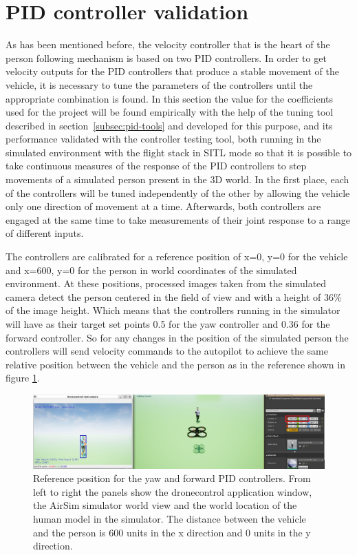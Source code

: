 
\clearpage

\section{PID controller validation}
\label{sec:test-1-pid}


As has been mentioned before, the velocity controller that is the heart of the person following mechanism is based on two PID controllers.
In order to get velocity outputs for the PID controllers that produce a stable movement of the vehicle, it is necessary to tune the parameters of the controllers until the appropriate combination is found.
In this section the value for the coefficients used for the project will be found empirically with the help of the tuning tool described in section~\ref{subsec:pid-tools} and developed for this purpose, and its performance validated with the controller testing tool, both running in the simulated environment with the flight stack in SITL mode so that it is possible to take continuous measures of the response of the PID controllers to step movements of a simulated person present in the 3D world.
In the first place, each of the controllers will be tuned independently of the other by allowing the vehicle only one direction of movement at a time.
Afterwards, both controllers are engaged at the same time to take measurements of their joint response to a range of different inputs.

The controllers are calibrated for a reference position of x=0, y=0 for the vehicle and x=600, y=0 for the person in world coordinates of the simulated environment.
At these positions, processed images taken from the simulated camera detect the person centered in the field of view and with a height of 36\% of the image height.
Which means that the controllers running in the simulator will have as their target set points 0.5 for the yaw controller and 0.36 for the forward controller. So for any changes in the position of the simulated person the controllers will send velocity commands to the autopilot to achieve the same relative position between the vehicle and the person as in the reference shown in figure \ref{fig:tune-start-pos}.

\begin{figure}
  \centering
  \includegraphics[width=\textwidth, keepaspectratio]{img/pid/tune-ref-pos.jpg}
  \caption{Reference position for the yaw and forward PID controllers. From left to right the panels show the dronecontrol application window, the AirSim simulator world view and the world location of the human model in the simulator. The distance between the vehicle and the person is 600 units in the x direction and 0 units in the y direction.}\label{fig:tune-start-pos}
\end{figure}

